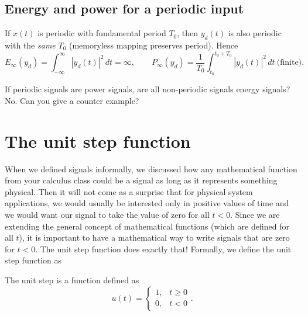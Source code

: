 \subsection*{Energy and power for a periodic input}
If $x(t)$ is periodic with fundamental period $T_0$, then $y_d(t)$ is also periodic with the \emph{same} $T_0$ (memoryless mapping preserves period). Hence
\[
E_\infty(y_d)=\int_{-\infty}^{\infty}\!|y_d(t)|^2\,dt=\infty,\qquad
P_\infty(y_d)=\frac{1}{T_0}\int_{t_0}^{t_0+T_0}\!|y_d(t)|^2\,dt\ \text{(finite)}.
\]
\begin{popquiz}
  If periodic signals are power signals, are all non-periodic signals energy signals?
  \popqsplit
  No. Can you give a counter example?
\end{popquiz}

\section{The unit step function}
When we defined signals informally, we discussed how any mathematical function from your calculus class could be a signal as long as it represents something physical. Then it will not come as a surprise that for physical system applications, we would usually be interested only in positive values of time and we would want our signal to take the value of zero for all $t < 0$. Since we are extending the general concept of mathematical functions (which are defined for all $t$), it is important to have a mathematical way to write signals that are zero for $t < 0$. The unit step function does exactly that! Formally, we define the unit step function as
\begin{definition}
The unit step is a function defined as
\[
u(t) = \begin{cases}
1, & t \geq 0 \\
0, & t < 0
\end{cases}.
\]
\end{definition}


